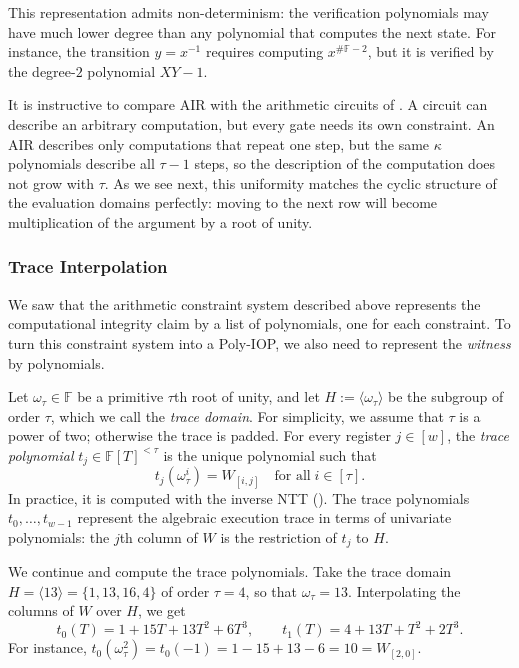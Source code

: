 \documentclass[../../book]{subfiles}
\begin{document}
This representation admits non-determinism: the verification polynomials may have much lower degree than any polynomial that computes the next state.
For instance, the transition $y = x^{-1}$ requires computing $x^{\#\mathbb{F} - 2}$, but it is verified by the degree-$2$ polynomial $XY - 1$.

\begin{remark}
  It is instructive to compare AIR with the arithmetic circuits of .
  A circuit can describe an arbitrary computation, but every gate needs its own constraint.
  An AIR describes only computations that repeat one step, but the same $\kappa$ polynomials describe all $\tau - 1$ steps, so the description of the computation does not grow with $\tau$.
  As we see next, this uniformity matches the cyclic structure of the evaluation domains perfectly: moving to the next row will become multiplication of the argument by a root of unity.
\end{remark}

\subsubsection{Trace Interpolation}

We saw that the arithmetic constraint system described above represents the computational integrity claim by a list of polynomials, one for each constraint.
To turn this constraint system into a Poly-IOP, we also need to represent the \emph{witness} by polynomials.

Let $\omega_\tau \in \mathbb{F}$ be a primitive $\tau$th root of unity, and let $H := \langle \omega_\tau \rangle$ be the subgroup of order $\tau$, which we call the \emph{trace domain}.
For simplicity, we assume that $\tau$ is a power of two; otherwise the trace is padded.
For every register $j \in [w]$, the \emph{trace polynomial} $t_j \in \mathbb{F}[T]^{<\tau}$ is the unique polynomial such that
\begin{equation*}
  t_j(\omega_\tau^i) = W_{[i,j]} \quad \text{for all} \; i \in [\tau].
\end{equation*}
In practice, it is computed with the inverse NTT ().
The trace polynomials $t_0, \ldots, t_{w-1}$ represent the algebraic execution trace in terms of univariate polynomials: the $j$th column of $W$ is the restriction of $t_j$ to $H$.

\begin{example}\label{ex:stark-fibsq-3}
  We continue  and compute the trace polynomials.
  Take the trace domain $H = \langle 13 \rangle = \{1, 13, 16, 4\}$ of order $\tau = 4$, so that $\omega_\tau = 13$.
  Interpolating the columns of $W$ over $H$, we get
  \begin{equation*}
    t_0(T) = 1 + 15T + 13T^2 + 6T^3, \qquad t_1(T) = 4 + 13T + T^2 + 2T^3.
  \end{equation*}
  For instance, $t_0(\omega_\tau^2) = t_0(-1) = 1 - 15 + 13 - 6 = 10 = W_{[2,0]}$.
\end{example}
\end{document}
